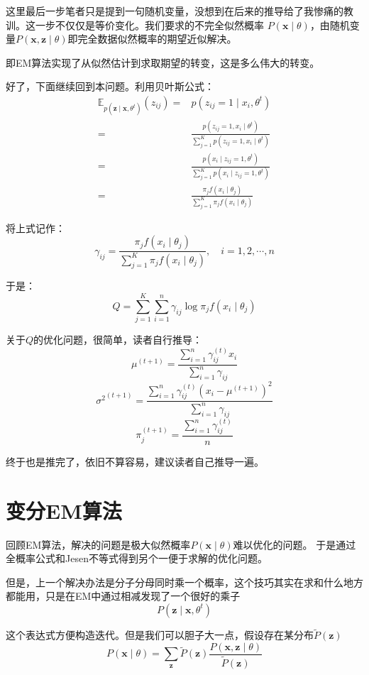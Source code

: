 \documentclass{article}
\begin{document}
        这里最后一步笔者只是提到一句随机变量，没想到在后来的推导给了我惨痛的教训。这一步不仅仅是等价变化。我们要求的不完全似然概率
        $P(\boldsymbol{x}\mid\theta)$，由随机变量$P(\boldsymbol{x},\boldsymbol{z}\mid\theta)$即完全数据似然概率的期望近似解决。

        即EM算法实现了从似然估计到求取期望的转变，这是多么伟大的转变。
        
        好了，下面继续回到本问题。利用贝叶斯公式：
        \begin{align*}
            \mathbb{E}_{p(\boldsymbol{z}\mid\boldsymbol{x},\theta^t)}(z_{ij})=&p(z_{ij}=1\mid x_i,\theta^t)\\
            =&\frac{p(z_{ij}=1,x_i\mid\theta^t)}{\sum_{j=1}^{K}p(z_{ij}=1,x_i\mid\theta^t)}\\
            =&\frac{p(x_i\mid z_{ij}=1,\theta^t)}{\sum_{j=1}^{K}p(x_i\mid z_{ij}=1,\theta^t)}\\
            =&\frac{\pi_jf(x_i\mid\theta_j)}{\sum_{j=1}^{K}\pi_jf(x_i\mid\theta_j)}
        \end{align*}

        将上式记作：
        \[\gamma_{ij}=\frac{\pi_jf(x_i\mid\theta_j)}{\sum_{j=1}^{K}\pi_jf(x_i\mid\theta_j)},\quad i=1,2,\cdots,n \]

        于是：
        \[Q=\sum_{j=1}^{K}\sum_{i=1}^{n}\gamma_{ij}\log \pi_jf(x_i\mid\theta_j)\]

        关于$Q$的优化问题，很简单，读者自行推导：
        \[\mu^{(t+1)}=\frac{\sum_{i=1}^{n}\gamma_{ij}^{(t)}x_i}{\sum_{i=1}^{n}\gamma_{ij}}\]
        \[{\sigma^2}^{(t+1)}=\frac{\sum_{i=1}^{n}\gamma_{ij}^{(t)}(x_i-\mu^{(t+1)})^2}{\sum_{i=1}^{n}\gamma_{ij}}\]
        \[\pi_j^{(t+1)}=\frac{\sum_{i=1}^{n}\gamma_{ij}^{(t)}}{n}\]

        终于也是推完了，依旧不算容易，建议读者自己推导一遍。

    \section{变分EM算法}
        回顾EM算法，解决的问题是极大似然概率$P(\boldsymbol{x}\mid\theta)$难以优化的问题。
        于是通过全概率公式和Jesen不等式得到另个一便于求解的优化问题。
        
        但是，上一个解决办法是分子分母同时乘一个概率，这个技巧其实在求和什么地方都能用，只是在EM中通过相减发现了一个很好的乘子
        \[P(\boldsymbol{z}\mid\boldsymbol{x},\theta^t)\]

        这个表达式方便构造迭代。但是我们可以胆子大一点，假设存在某分布$\widetilde{P}(\boldsymbol{z})$
        \[P(\boldsymbol{x}\mid\theta)=\sum_{\boldsymbol{z}}\widetilde{P}(\boldsymbol{z})\frac{P(\boldsymbol{x},\boldsymbol{z}\mid\theta)}{\widetilde{P}(\boldsymbol{z})}\]
        
\end{document}
